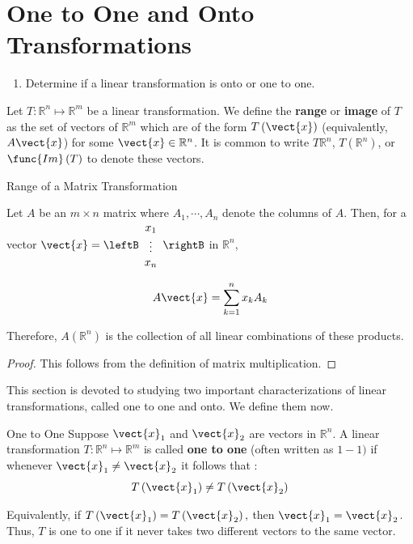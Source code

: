 \section{One to One and Onto Transformations}

\begin{outcome}
\begin{enumerate}
\item[A.]  Determine if a linear transformation is onto or one to one.
\end{enumerate}
\end{outcome}

Let $T: \mathbb{R}^n \mapsto \mathbb{R}^m$ be a linear transformation. We define the \textbf{range}  or \textbf{image}  of $T$ as the set of vectors of $\mathbb{R}^{m}$ which are of the form
$T \left(\vect{x}\right)$ (equivalently, $A\vect{x}$) for some $\vect{x}\in \mathbb{R}^{n}$. It is common
to write $T\mathbb{R}^{n}$, $T\left( \mathbb{R}^{n}\right)$, or
$\func{Im}\left( T\right) $ to denote these vectors.  

\begin{lemma}{Range of a Matrix Transformation}\label{lem:Ax}

Let $A$ be an $m\times n$ matrix where $A_{1},\cdots , A_{n}$ denote the columns of
$A.$  Then, for a vector $\vect{x}=\leftB 
\begin{array}{c}
x_{1} \\
\vdots \\
 x_{n}
\end{array}
\rightB$ in $\mathbb{R}^n$,

\begin{equation*}
A\vect{x}=\sum_{k=1}^{n}x_{k}A_{k}
\end{equation*}

Therefore, $A \left( \mathbb{R}^n \right)$ is the collection of all
linear combinations of these products.
\end{lemma}

\begin{proof}
This follows from the definition of matrix multiplication.
\end{proof}

This section is devoted to studying two important characterizations of linear transformations, called one to one and onto. We define them now. 

\begin{definition}{One to One}\label{def:onetoone}
Suppose $\vect{x}_1$ and $\vect{x}_2$ are vectors in $\mathbb{R}^n$. A linear transformation $T: \mathbb{R}^n \mapsto \mathbb{R}^m$ is called \textbf{one to one}
 (often written as $1-1)$ if whenever
 $\vect{x}_1 \neq \vect{x}_2$ it follows that :
\begin{equation*}
T\left( \vect{x}_1 \right) \neq T \left(\vect{x}_2\right)
\end{equation*}

Equivalently, if $T\left( \vect{x}_1 \right) =T\left( \vect{x}_2\right) ,$
then $\vect{x}_1 = \vect{x}_2$. Thus,  $T$ is one to one if it never takes two different
vectors to the same vector.
\end{definition}

